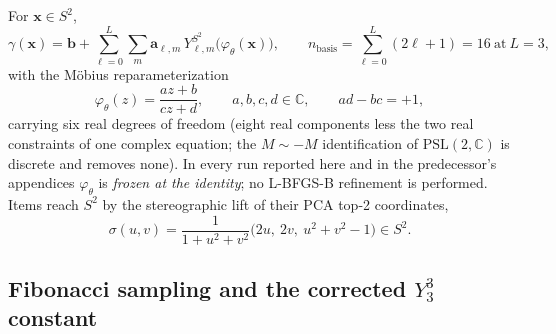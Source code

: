 \documentclass[11pt,a4paper]{article}
\theoremstyle{plain}
\theoremstyle{remark}
\theoremstyle{plain}
\begin{document}
For $\mathbf{x}\in S^2$,
\begin{equation}
\gamma(\mathbf{x})=\mathbf{b}+\sum_{\ell=0}^{L}\sum_{m}\mathbf{a}_{\ell,m}\,Y^{S^2}_{\ell,m}\!\big(\varphi_\theta(\mathbf{x})\big),
\qquad n_{\mathrm{basis}}=\sum_{\ell=0}^{L}(2\ell+1)=16\ \text{at}\ L=3,
\label{eq:hyperspherical}
\end{equation}
with the M\"obius reparameterization
\begin{equation}
\varphi_\theta(z)=\frac{az+b}{cz+d},\qquad a,b,c,d\in\mathbb{C},\qquad ad-bc=+1,
\label{eq:mobius}
\end{equation}
carrying six real degrees of freedom (eight real components less the two real constraints of one complex equation; the $M\sim-M$ identification of $\mathrm{PSL}(2,\mathbb{C})$ is discrete and removes none). In every run reported here and in the predecessor's appendices $\varphi_\theta$ is \emph{frozen at the identity}; no L-BFGS-B refinement is performed. Items reach $S^2$ by the stereographic lift of their PCA top-2 coordinates,
\begin{equation}
\sigma(u,v)=\frac{1}{1+u^2+v^2}\big(2u,\ 2v,\ u^2+v^2-1\big)\in S^2 .
\label{eq:stereographic}
\end{equation}

\subsection{Fibonacci sampling and the corrected $Y_3^3$ constant}
\end{document}
